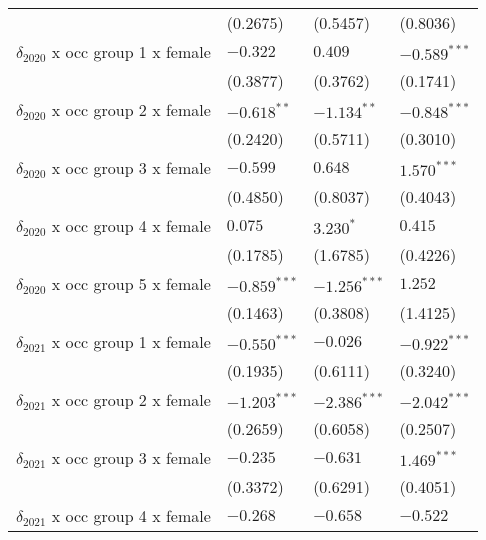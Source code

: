 \begin{tabular}{llll}
                                         &           (0.2675) &           (0.5457) &           (0.8036) \\
$\delta_{2020}$ x occ group 1 x female   &           $-0.322$ &            $0.409$ &     $-0.589^{***}$ \\
                                         &           (0.3877) &           (0.3762) &           (0.1741) \\
$\delta_{2020}$ x occ group 2 x female   &      $-0.618^{**}$ &      $-1.134^{**}$ &     $-0.848^{***}$ \\
                                         &           (0.2420) &           (0.5711) &           (0.3010) \\
$\delta_{2020}$ x occ group 3 x female   &           $-0.599$ &            $0.648$ &      $1.570^{***}$ \\
                                         &           (0.4850) &           (0.8037) &           (0.4043) \\
$\delta_{2020}$ x occ group 4 x female   &            $0.075$ &          $3.230^*$ &            $0.415$ \\
                                         &           (0.1785) &           (1.6785) &           (0.4226) \\
$\delta_{2020}$ x occ group 5 x female   &     $-0.859^{***}$ &     $-1.256^{***}$ &            $1.252$ \\
                                         &           (0.1463) &           (0.3808) &           (1.4125) \\
$\delta_{2021}$ x occ group 1 x female   &     $-0.550^{***}$ &           $-0.026$ &     $-0.922^{***}$ \\
                                         &           (0.1935) &           (0.6111) &           (0.3240) \\
$\delta_{2021}$ x occ group 2 x female   &     $-1.203^{***}$ &     $-2.386^{***}$ &     $-2.042^{***}$ \\
                                         &           (0.2659) &           (0.6058) &           (0.2507) \\
$\delta_{2021}$ x occ group 3 x female   &           $-0.235$ &           $-0.631$ &      $1.469^{***}$ \\
                                         &           (0.3372) &           (0.6291) &           (0.4051) \\
$\delta_{2021}$ x occ group 4 x female   &           $-0.268$ &           $-0.658$ &           $-0.522$ \\

\end{tabular}
